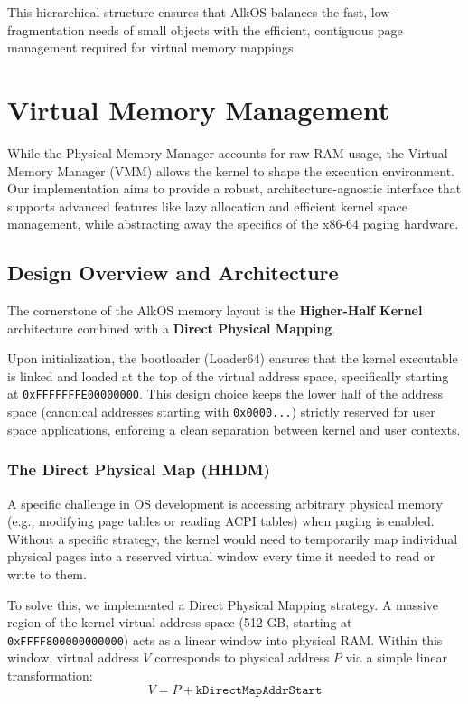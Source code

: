 \documentclass[a4paper,10pt,twoside]{report}
\theoremstyle{definition}
\begin{document}
This hierarchical structure ensures that AlkOS balances the fast, low-fragmentation needs of small objects with the efficient, contiguous page management required for virtual memory mappings.

\section{Virtual Memory Management}
\label{sec:impl_vmm}

While the Physical Memory Manager accounts for raw RAM usage, the Virtual Memory Manager (VMM) allows the kernel to shape the execution environment. Our implementation aims to provide a robust, architecture-agnostic interface that supports advanced features like lazy allocation and efficient kernel space management, while abstracting away the specifics of the x86-64 paging hardware.

\subsection{Design Overview and Architecture}

The cornerstone of the AlkOS memory layout is the \textbf{Higher-Half Kernel} architecture combined with a \textbf{Direct Physical Mapping}. 

Upon initialization, the bootloader (Loader64) ensures that the kernel executable is linked and loaded at the top of the virtual address space, specifically starting at \texttt{0xFFFFFFFE00000000}. This design choice keeps the lower half of the address space (canonical addresses starting with \texttt{0x0000...}) strictly reserved for user space applications, enforcing a clean separation between kernel and user contexts.

\subsubsection{The Direct Physical Map (HHDM)}

A specific challenge in OS development is accessing arbitrary physical memory (e.g., modifying page tables or reading ACPI tables) when paging is enabled. Without a specific strategy, the kernel would need to temporarily map individual physical pages into a reserved virtual window every time it needed to read or write to them.

To solve this, we implemented a Direct Physical Mapping strategy. A massive region of the kernel virtual address space (512 GB, starting at \texttt{0xFFFF800000000000}) acts as a linear window into physical RAM. Within this window, virtual address $V$ corresponds to physical address $P$ via a simple linear transformation:
\[ V = P + \texttt{kDirectMapAddrStart} \]
\end{document}
